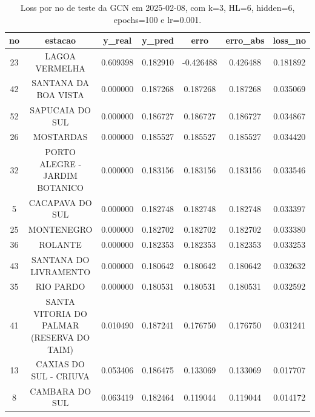 \begin{table}[h]
\centering
\caption{Loss por no de teste da GCN em 2025-02-08, com k=3, HL=6, hidden=6, epochs=100 e lr=0.001.}
\label{tab:gcn_loss_k3_hl6_h6_e100_d20250208}
\begin{tabular}{ccccccc}
\toprule
no & estacao & y\_real & y\_pred & erro & erro\_abs & loss\_no \\
\midrule
23 & LAGOA VERMELHA & 0.609398 & 0.182910 & -0.426488 & 0.426488 & 0.181892 \\
42 & SANTANA DA BOA VISTA & 0.000000 & 0.187268 & 0.187268 & 0.187268 & 0.035069 \\
52 & SAPUCAIA DO SUL & 0.000000 & 0.186727 & 0.186727 & 0.186727 & 0.034867 \\
26 & MOSTARDAS & 0.000000 & 0.185527 & 0.185527 & 0.185527 & 0.034420 \\
32 & PORTO ALEGRE - JARDIM BOTANICO & 0.000000 & 0.183156 & 0.183156 & 0.183156 & 0.033546 \\
5 & CACAPAVA DO SUL & 0.000000 & 0.182748 & 0.182748 & 0.182748 & 0.033397 \\
25 & MONTENEGRO & 0.000000 & 0.182702 & 0.182702 & 0.182702 & 0.033380 \\
36 & ROLANTE & 0.000000 & 0.182353 & 0.182353 & 0.182353 & 0.033253 \\
43 & SANTANA DO LIVRAMENTO & 0.000000 & 0.180642 & 0.180642 & 0.180642 & 0.032632 \\
35 & RIO PARDO & 0.000000 & 0.180531 & 0.180531 & 0.180531 & 0.032592 \\
41 & SANTA VITORIA DO PALMAR (RESERVA DO TAIM) & 0.010490 & 0.187241 & 0.176750 & 0.176750 & 0.031241 \\
13 & CAXIAS DO SUL - CRIUVA & 0.053406 & 0.186475 & 0.133069 & 0.133069 & 0.017707 \\
8 & CAMBARA DO SUL & 0.063419 & 0.182464 & 0.119044 & 0.119044 & 0.014172 \\
\bottomrule
\end{tabular}
\end{table}
